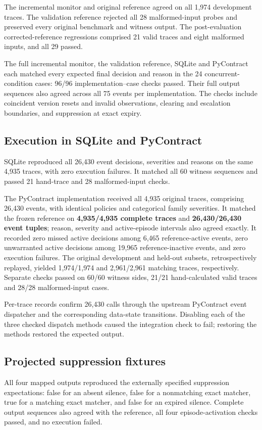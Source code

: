 \documentclass[preprint,11pt]{elsarticle}
\begin{document}
The incremental monitor and original reference agreed on all 1,974 development traces. The validation reference rejected all 28 malformed-input probes and preserved every original benchmark and witness output. The post-evaluation corrected-reference regressions comprised 21 valid traces and eight malformed inputs, and all 29 passed.

The full incremental monitor, the validation reference, SQLite and PyContract each matched every expected final decision and reason in the 24 concurrent-condition cases: 96/96 implementation--case checks passed. Their full output sequences also agreed across all 75 events per implementation. The checks include coincident version resets and invalid observations, clearing and escalation boundaries, and suppression at exact expiry.

\subsection{Execution in SQLite and PyContract}
SQLite reproduced all 26,430 event decisions, severities and reasons on the same 4,935 traces, with zero execution failures. It matched all 60 witness sequences and passed 21 hand-trace and 28 malformed-input checks.

The PyContract implementation received all 4,935 original traces, comprising 26,430 events, with identical policies and categorical family severities. It matched the frozen reference on \textbf{4,935/4,935 complete traces} and \textbf{26,430/26,430 event tuples}; reason, severity and active-episode intervals also agreed exactly. It recorded zero missed active decisions among 6,465 reference-active events, zero unwarranted active decisions among 19,965 reference-inactive events, and zero execution failures. The original development and held-out subsets, retrospectively replayed, yielded 1,974/1,974 and 2,961/2,961 matching traces, respectively. Separate checks passed on 60/60 witness sides, 21/21 hand-calculated valid traces and 28/28 malformed-input cases.

Per-trace records confirm 26,430 calls through the upstream PyContract event dispatcher and the corresponding data-state transitions. Disabling each of the three checked dispatch methods caused the integration check to fail; restoring the methods restored the expected output.

\subsection{Projected suppression fixtures}
All four mapped outputs reproduced the externally specified suppression expectations: false for an absent silence, false for a nonmatching exact matcher, true for a matching exact matcher, and false for an expired silence. Complete output sequences also agreed with the reference, all four episode-activation checks passed, and no execution failed.
\end{document}
